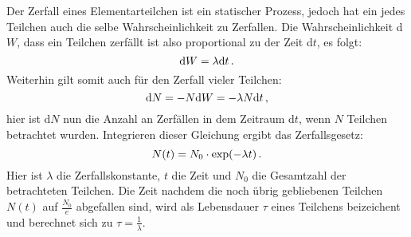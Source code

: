        Der Zerfall eines Elementarteilchen ist ein statischer Prozess, jedoch hat ein jedes Teilchen auch die selbe Wahrscheinlichkeit zu Zerfallen.
        Die Wahrscheinlichkeit d$W$, dass ein Teilchen zerfällt ist also proportional zu der Zeit d$t$, es folgt:
        \begin{equation}
            \text{d}W = \lambda\text{d}t \, .
        \end{equation}
        Weiterhin gilt somit auch für den Zerfall vieler Teilchen:
        \begin{equation}
            \text{d}N = -N\text{d}W = -\lambda N \text{d}t \, ,
        \end{equation}
       hier ist d$N$ nun die Anzahl an Zerfällen in dem Zeitraum d$t$, wenn $N$ Teilchen betrachtet wurden.
       Integrieren dieser Gleichung ergibt das Zerfallsgesetz:
       \begin{equation}
           N(t) = N_0 \cdot \text{exp}(-\lambda t)\, .
       \end{equation}
       Hier ist $\lambda$ die Zerfallskonstante, $t$ die Zeit und $N_0$ die Gesamtzahl der betrachteten Teilchen. 
       Die Zeit nachdem die noch übrig gebliebenen Teilchen $N(t)$ auf $\frac{N_0}{e}$ abgefallen sind, wird als Lebensdauer $\tau$ eines Teilchens beizeichent und berechnet sich zu $\tau = \frac{1}{\lambda}$.





